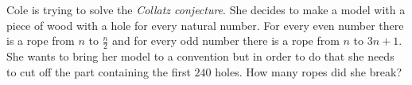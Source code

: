 Cole is trying to solve the \emph{Collatz conjecture}. She decides to make a model with a piece of wood with a hole for every natural number. For every even number there is a rope from $n$ to $\frac{n}{2}$ and for every odd number there is a rope from $n$ to $3n+1$. She wants to bring her model to a convention but in order to do that she needs to cut off the part containing the first $240$ holes. How many ropes did she break?